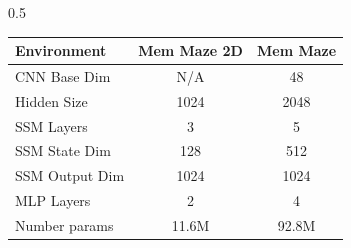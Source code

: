 \begin{table}[!ht]
\begin{subtable}{0.5\textwidth}
    \centering
    \hfill \break
    \begin{tabular}{lcc}
    \toprule
    Environment & Mem Maze 2D & Mem Maze \\
    \midrule
    CNN Base Dim & N/A & 48 \\
    Hidden Size & 1024 & 2048 \\
    SSM Layers & 3 & 5 \\
    SSM State Dim & 128 & 512 \\
    SSM Output Dim & 1024 & 1024 \\
    MLP Layers & 2 & 4 \\
    \midrule
    Number params & 11.6M & 92.8M \\
    \bottomrule
    \end{tabular}
\end{subtable}

\label{table:wm_params}
\end{table}

\newpage

